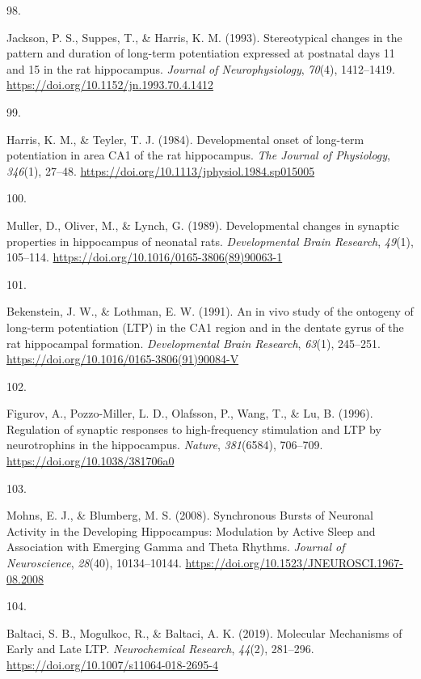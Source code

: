 \documentclass[
  11pt,
  letterpaper,
]{scrreprt}
\newlength{\cslhangindent}
\newlength{\csllabelwidth}
\newenvironment{CSLReferences}[2] %
 {\begin{list}{}{%
  \setlength{\itemindent}{0pt}
  \setlength{\leftmargin}{0pt}
  \setlength{\parsep}{0pt}
  \ifodd #1
   \setlength{\leftmargin}{\cslhangindent}
   \setlength{\itemindent}{-1\cslhangindent}
  \fi
  \setlength{\itemsep}{#2\baselineskip}}}
 {\end{list}}
\newcommand{\CSLLeftMargin}[1]{\parbox[t]{\csllabelwidth}{\strut#1\strut}}
\newcommand{\CSLRightInline}[1]{\parbox[t]{\linewidth - \csllabelwidth}{\strut#1\strut}}
\begin{document}
\begin{CSLReferences}{0}{0}
\CSLLeftMargin{98. }%
\CSLRightInline{Jackson, P. S., Suppes, T., \& Harris, K. M. (1993).
Stereotypical changes in the pattern and duration of long-term
potentiation expressed at postnatal days 11 and 15 in the rat
hippocampus. \emph{Journal of Neurophysiology}, \emph{70}(4),
1412--1419. \url{https://doi.org/10.1152/jn.1993.70.4.1412}}

\CSLLeftMargin{99. }%
\CSLRightInline{Harris, K. M., \& Teyler, T. J. (1984). Developmental
onset of long-term potentiation in area {CA1} of the rat hippocampus.
\emph{The Journal of Physiology}, \emph{346}(1), 27--48.
\url{https://doi.org/10.1113/jphysiol.1984.sp015005}}

\CSLLeftMargin{100. }%
\CSLRightInline{Muller, D., Oliver, M., \& Lynch, G. (1989).
Developmental changes in synaptic properties in hippocampus of neonatal
rats. \emph{Developmental Brain Research}, \emph{49}(1), 105--114.
\url{https://doi.org/10.1016/0165-3806(89)90063-1}}

\CSLLeftMargin{101. }%
\CSLRightInline{Bekenstein, J. W., \& Lothman, E. W. (1991). An in vivo
study of the ontogeny of long-term potentiation ({LTP}) in the {CA1}
region and in the dentate gyrus of the rat hippocampal formation.
\emph{Developmental Brain Research}, \emph{63}(1), 245--251.
\url{https://doi.org/10.1016/0165-3806(91)90084-V}}

\CSLLeftMargin{102. }%
\CSLRightInline{Figurov, A., Pozzo-Miller, L. D., Olafsson, P., Wang,
T., \& Lu, B. (1996). Regulation of synaptic responses to high-frequency
stimulation and {LTP} by neurotrophins in the hippocampus.
\emph{Nature}, \emph{381}(6584), 706--709.
\url{https://doi.org/10.1038/381706a0}}

\CSLLeftMargin{103. }%
\CSLRightInline{Mohns, E. J., \& Blumberg, M. S. (2008). Synchronous
{Bursts} of {Neuronal Activity} in the {Developing Hippocampus}:
{Modulation} by {Active Sleep} and {Association} with {Emerging Gamma}
and {Theta Rhythms}. \emph{Journal of Neuroscience}, \emph{28}(40),
10134--10144. \url{https://doi.org/10.1523/JNEUROSCI.1967-08.2008}}

\CSLLeftMargin{104. }%
\CSLRightInline{Baltaci, S. B., Mogulkoc, R., \& Baltaci, A. K. (2019).
Molecular {Mechanisms} of {Early} and {Late LTP}. \emph{Neurochemical
Research}, \emph{44}(2), 281--296.
\url{https://doi.org/10.1007/s11064-018-2695-4}}


\end{CSLReferences}
\end{document}
